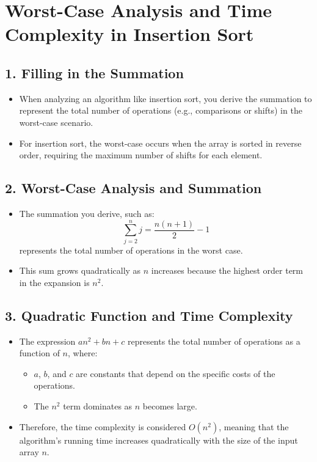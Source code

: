 \documentclass{article}
\begin{document}
\section*{Worst-Case Analysis and Time Complexity in Insertion Sort}

\subsection*{1. Filling in the Summation}
\begin{itemize}
    \item When analyzing an algorithm like insertion sort, you derive the summation to represent the total number of operations (e.g., comparisons or shifts) in the worst-case scenario.
    \item For insertion sort, the worst-case occurs when the array is sorted in reverse order, requiring the maximum number of shifts for each element.
\end{itemize}

\subsection*{2. Worst-Case Analysis and Summation}
\begin{itemize}
    \item The summation you derive, such as:
    \[
    \sum_{j=2}^{n} j = \frac{n(n+1)}{2} - 1
    \]
    represents the total number of operations in the worst case.
    \item This sum grows quadratically as \(n\) increases because the highest order term in the expansion is \(n^2\).
\end{itemize}

\subsection*{3. Quadratic Function and Time Complexity}
\begin{itemize}
    \item The expression \(an^2 + bn + c\) represents the total number of operations as a function of \(n\), where:
    \begin{itemize}
        \item \(a\), \(b\), and \(c\) are constants that depend on the specific costs of the operations.
        \item The \(n^2\) term dominates as \(n\) becomes large.
    \end{itemize}
    \item Therefore, the time complexity is considered \(O(n^2)\), meaning that the algorithm's running time increases quadratically with the size of the input array \(n\).
\end{itemize}
\end{document}
